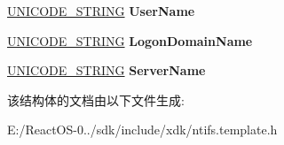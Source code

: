 \begin{DoxyCompactItemize}
\item 
\mbox{\label{struct___m_s_v1__0___g_e_t_c_h_a_l_l_e_n_r_e_s_p___r_e_q_u_e_s_t_a3829b683e256b6321f35260396523b54}} 
\hyperlink{struct___u_n_i_c_o_d_e___s_t_r_i_n_g}{U\+N\+I\+C\+O\+D\+E\+\_\+\+S\+T\+R\+I\+NG} {\bfseries User\+Name}
\item 
\mbox{\label{struct___m_s_v1__0___g_e_t_c_h_a_l_l_e_n_r_e_s_p___r_e_q_u_e_s_t_a4068d82ec94cd87f63f7d5f3cba07d21}} 
\hyperlink{struct___u_n_i_c_o_d_e___s_t_r_i_n_g}{U\+N\+I\+C\+O\+D\+E\+\_\+\+S\+T\+R\+I\+NG} {\bfseries Logon\+Domain\+Name}
\item 
\mbox{\label{struct___m_s_v1__0___g_e_t_c_h_a_l_l_e_n_r_e_s_p___r_e_q_u_e_s_t_a77f6924f97a466674d670b2d44688f9c}} 
\hyperlink{struct___u_n_i_c_o_d_e___s_t_r_i_n_g}{U\+N\+I\+C\+O\+D\+E\+\_\+\+S\+T\+R\+I\+NG} {\bfseries Server\+Name}
\end{DoxyCompactItemize}


该结构体的文档由以下文件生成\+:\begin{DoxyCompactItemize}
\item 
E\+:/\+React\+O\+S-\/0../sdk/include/xdk/ntifs.\+template.\+h\end{DoxyCompactItemize}
